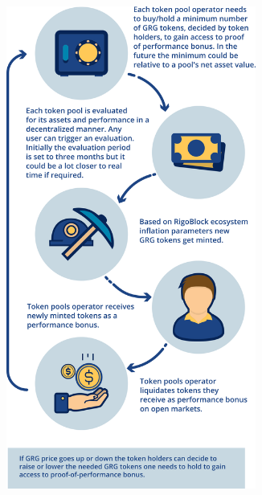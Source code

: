 \documentclass[9pt,oneside]{amsart}
\begin{document}
\begin{multicols}{2}
\includegraphics[width=8.2cm]{pop-tokenomics1.png}


\end{multicols}
\end{document}
